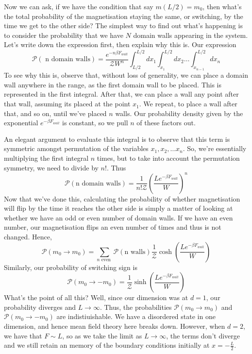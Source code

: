 \documentclass[11pt, oneside]{article}   	%
\begin{document}
Now we can ask, if we have the condition that say $ m ( L / 2 ) = m_0 $, 
then what's the total probability of the magnetisation staying the same, 
or switching, by the time we get to the other side? 
The simplest way to find out what's happening is to consider 
the probability that we have $ N $ domain walls appearing in the system. 
Let's write down the expression first, then explain why this is. 
Our expression 
\[
	\mathcal{ P }\left( \text{ n domain walls}  \right)  = \frac{e^{ - n \beta F_{wall}}}{\mathcal{Z} W^n } \int_{L / 2}^{ L / 2 } dx_1 \int_{x_1}^{ L / 2 } dx_2 \dots \int_{ x_{n-1}}^{ L / 2} dx_n  
\] To see why this is, observe that, without loss of generality, we can place a domain wall anywhere
in the range, as the first domain wall to be placed. This is represented in the first integral. 
After that, we can place a wall any point after that wall, assuming 
its placed at the point $ x_{1}$. We repeat, to place a wall after that, and so on, 
until we've placed $n $ walls. 
Our probability density given by the exponential $ e^{ - \beta F_{wall}}$ is constant, so we
pull $ n $ of these factors out. 

An elegant argument to evaluate this integral is to observe that 
this term is symmetric amongst permutation of the variables $ x_1, x_2, \dots x_n $. 
So, we're essentially multiplying the first integral $ n $ times, 
but to take into account the permutation symmetry, we need to 
divide by $ n ! $. 
Thus 
\[
	\mathcal{ P }\left( \text{n domain walls} \right) = \frac{1}{n! \mathcal{ Z}} \left( \frac{L e^{ - \beta F_{wall}}}{ W} \right)^{n }   
\] Now that we've done this, calculating the probability of whether 
magnetisation will flip by the time it reaches the other side 
is simply a matter of looking at whether we have an odd or even 
number of domain walls. If we have an even number, 
our magnetisation flips an even number of times and thus is not changed. Hence, 
\[
	\mathcal{ P }( m_0 \to  m_0 )  = \sum_{n \text{ even }} \mathcal{P }\left( \text{n walls} \right) \frac{1}{\mathcal{Z}} \cosh \left( \frac{L e^{ - \beta F_{wall}}}{ W } \right)  
\] Similarly, our probability of switching sign is 
\[
	\mathcal{ P }( m_{0} \to   - m_0 ) = \frac{1}{\mathcal{ Z}} \sinh \left( \frac{L e^{ - \beta F_{wall}}}{ W} \right) 
\] What's the point of all this? 
Well, since our dimension was at $d = 1$, our probability diverges and $ L \to \infty $.
Thus, the probabilities $ \mathcal{ P }( m_0 \to  m _0 ) $ and $ \mathcal{P }( m_0 \to - m_0 ) $ 
are indistiuishable. 
We have a disordered state in one dimension, and hence mean field theory 
here breaks down. However, when 
$ d = 2$, we have that $ F \sim L $, so as we take the limit
as  $ L \to  \infty $, the terms don't diverge and we still retain an memory of 
the boundary conditions initially at $ x =  - \frac{L}{2}$. 
\end{document}
